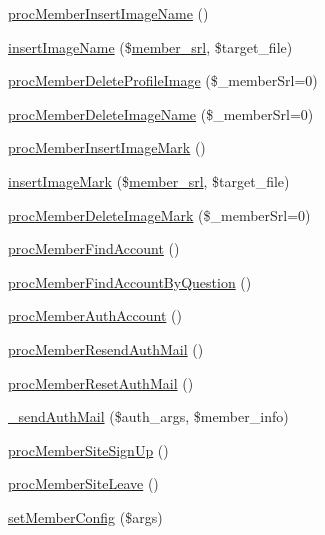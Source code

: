\begin{DoxyCompactItemize}
\item 
\hyperlink{classmemberController_a5477f3466e28c09d13f182406893a3d6}{proc\-Member\-Insert\-Image\-Name} ()
\item 
\hyperlink{classmemberController_a723651429eec4409cc58daefb508e7bf}{insert\-Image\-Name} (\$\hyperlink{ko_8install_8php_aa61f9e08f0fe505094d26f8143f30bbd}{member\-\_\-srl}, \$target\-\_\-file)
\item 
\hyperlink{classmemberController_a469c2f84ff27c0fb9fc9ae7f3b921548}{proc\-Member\-Delete\-Profile\-Image} (\$\-\_\-member\-Srl=0)
\item 
\hyperlink{classmemberController_a5b2d6f21719829dcf1b422e9958bcf48}{proc\-Member\-Delete\-Image\-Name} (\$\-\_\-member\-Srl=0)
\item 
\hyperlink{classmemberController_afcb874e178e1c13158e364b891998640}{proc\-Member\-Insert\-Image\-Mark} ()
\item 
\hyperlink{classmemberController_a99efb504d3ab31a6365434696cb7b2fb}{insert\-Image\-Mark} (\$\hyperlink{ko_8install_8php_aa61f9e08f0fe505094d26f8143f30bbd}{member\-\_\-srl}, \$target\-\_\-file)
\item 
\hyperlink{classmemberController_a22dff50295755ba06fb55d60104dbb32}{proc\-Member\-Delete\-Image\-Mark} (\$\-\_\-member\-Srl=0)
\item 
\hyperlink{classmemberController_a6ba64b98fa5d0fd55435e464f02d050e}{proc\-Member\-Find\-Account} ()
\item 
\hyperlink{classmemberController_a1141d3b40fc5927dcbaff3b4b4b11bff}{proc\-Member\-Find\-Account\-By\-Question} ()
\item 
\hyperlink{classmemberController_a2dfdfbe05e0248b65c9aadf969195c12}{proc\-Member\-Auth\-Account} ()
\item 
\hyperlink{classmemberController_aa0e4416a4e98fc31701ba68581b7c14b}{proc\-Member\-Resend\-Auth\-Mail} ()
\item 
\hyperlink{classmemberController_ab0515bd2aae55dbda2049d39612ef6b2}{proc\-Member\-Reset\-Auth\-Mail} ()
\item 
\hyperlink{classmemberController_a8768cc1066bf70222fdd0f0fa2d55d31}{\-\_\-send\-Auth\-Mail} (\$auth\-\_\-args, \$member\-\_\-info)
\item 
\hyperlink{classmemberController_a4dfc326f5bc6d97b86b919c568457000}{proc\-Member\-Site\-Sign\-Up} ()
\item 
\hyperlink{classmemberController_a46240bb8dbfcff52844ce8387076ca61}{proc\-Member\-Site\-Leave} ()
\item 
\hyperlink{classmemberController_a842fafd2abf22d779591486124003d92}{set\-Member\-Config} (\$args)

\end{DoxyCompactItemize}
